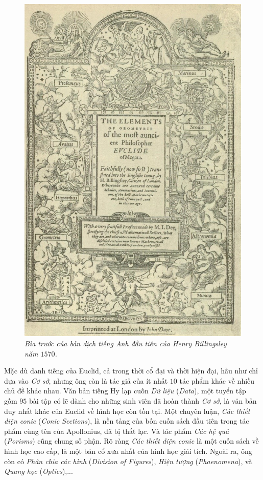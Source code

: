 \begin{multicols}{2}
\begin{figure}[H]
		\includegraphics[width= 1\linewidth]{3}
		\caption{\small\textit{\color{lichsutoanhoc}Bìa trước của bản dịch tiếng Anh đầu tiên của Henry Billingsley năm $1570$.}}
		\vspace*{-10pt}
	\end{figure} 
	Mặc dù danh tiếng của Euclid, cả trong thời cổ đại và thời hiện đại, hầu như chỉ dựa vào \textit{Cơ sở}, nhưng ông còn là tác giả của ít nhất $10$ tác phẩm khác về nhiều chủ đề khác nhau. Văn bản tiếng Hy lạp cuốn \textit{Dữ liệu} (\textit{Data}), một tuyển tập gồm $95$ bài tập có lẽ dành cho những sinh viên đã hoàn thành \textit{Cơ sở}, là văn bản duy nhất khác của Euclid về hình học còn tồn tại. Một chuyên luận, \textit{Các thiết diện conic} (\textit{Conic Sections}), là nền tảng của bốn cuốn sách đầu tiên trong tác phẩm cùng tên của Apollonius, đã bị thất lạc. Và tác phẩm \textit{Các hệ quả} (\textit{Porisms}) cũng  chung số phận. Rõ ràng \textit{Các thiết diện conic} là một cuốn sách về hình học cao cấp, là một bản cổ xưa nhất của hình học giải tích. Ngoài ra, ông còn có \textit{Phân chia các  hình} (\textit{Division of Figures}), \textit{Hiện tượng} (\textit{Phaenomena}), và \textit{Quang học} (\textit{Optics}),...

\end{multicols}
